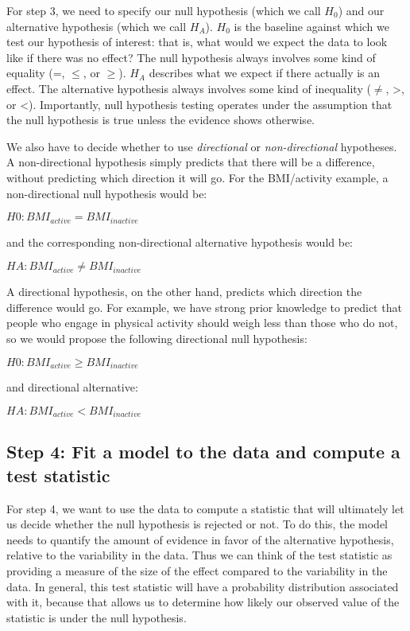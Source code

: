\documentclass[]{book}
\theoremstyle{definition}
\theoremstyle{definition}
\theoremstyle{definition}
\theoremstyle{remark}
\begin{document}
For step 3, we need to specify our null hypothesis (which we call
\(H_0\)) and our alternative hypothesis (which we call \(H_A\)). \(H_0\)
is the baseline against which we test our hypothesis of interest: that
is, what would we expect the data to look like if there was no effect?
The null hypothesis always involves some kind of equality (=, \(\le\),
or \(\ge\)). \(H_A\) describes what we expect if there actually is an
effect. The alternative hypothesis always involves some kind of
inequality (\(\ne\), \textgreater{}, or \textless{}). Importantly, null
hypothesis testing operates under the assumption that the null
hypothesis is true unless the evidence shows otherwise.

We also have to decide whether to use \emph{directional} or
\emph{non-directional} hypotheses. A non-directional hypothesis simply
predicts that there will be a difference, without predicting which
direction it will go. For the BMI/activity example, a non-directional
null hypothesis would be:

\(H0: BMI_{active} = BMI_{inactive}\)

and the corresponding non-directional alternative hypothesis would be:

\(HA: BMI_{active} \neq BMI_{inactive}\)

A directional hypothesis, on the other hand, predicts which direction
the difference would go. For example, we have strong prior knowledge to
predict that people who engage in physical activity should weigh less
than those who do not, so we would propose the following directional
null hypothesis:

\(H0: BMI_{active} \ge BMI_{inactive}\)

and directional alternative:

\(HA: BMI_{active} < BMI_{inactive}\)

\subsection{Step 4: Fit a model to the data and compute a test
statistic}\label{step-4-fit-a-model-to-the-data-and-compute-a-test-statistic}

For step 4, we want to use the data to compute a statistic that will
ultimately let us decide whether the null hypothesis is rejected or not.
To do this, the model needs to quantify the amount of evidence in favor
of the alternative hypothesis, relative to the variability in the data.
Thus we can think of the test statistic as providing a measure of the
size of the effect compared to the variability in the data. In general,
this test statistic will have a probability distribution associated with
it, because that allows us to determine how likely our observed value of
the statistic is under the null hypothesis.
\end{document}
